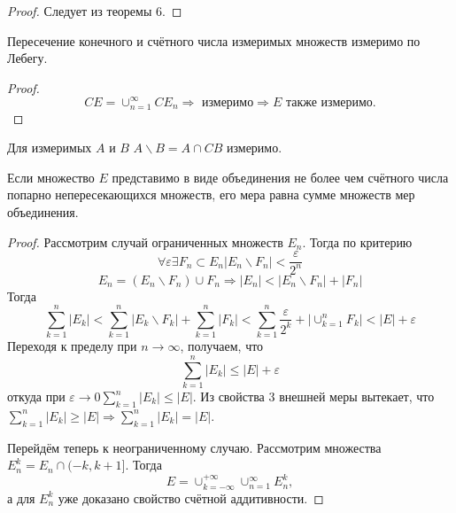 \documentclass[11pt]{article}
\newcounter{th}\setcounter{th}{0}
\def\th{\par\smallskip\refstepcounter{th}\textbf{\arabic{th}}}
\newtheorem*{Theorem}{Теорема \th}
\begin{document}
\begin{proof}
Следует из теоремы 6.
\end{proof}
\begin{Theorem}
Пересечение конечного и счётного числа измеримых множеств измеримо по Лебегу.
\end{Theorem}
\begin{proof}
\begin{equation*}
CE = \cup_{n = 1}^{\infty}CE_n \Rightarrow \text{ измеримо} \Rightarrow E\text{ также измеримо.}
\end{equation*}
\end{proof}
\begin{Theorem}
Для измеримых $A$ и $B$ $A \backslash B = A \cap CB$ измеримо.
\end{Theorem}
\begin{Theorem}
Если множество $E$ представимо в виде объединения не более чем счётного числа попарно
непересекающихся множеств, его мера равна сумме множеств мер объединения.
\end{Theorem}
\begin{proof}
Рассмотрим случай ограниченных множеств $E_n$. Тогда по критерию
\begin{equation*}
\forall \varepsilon \exists F_n \subset E_n |E_n \backslash F_n| < \frac{\varepsilon}{2^n}
\end{equation*}
\begin{equation*}
E_n = (E_n \backslash F_n) \cup F_n \Rightarrow |E_n| < |E_n \backslash F_n| + |F_n|
\end{equation*}
Тогда
\begin{equation*}
\sum_{k = 1}^n|E_k| < \sum_{k = 1}^n|E_k \backslash F_k| + \sum_{k = 1}^n|F_k| <
\sum_{k = 1}^n\frac{\varepsilon}{2^k} + |\cup_{k = 1}^nF_k| < |E| + \varepsilon
\end{equation*}
Переходя к пределу при $n \to \infty$, получаем, что
\begin{equation*}
\sum_{k = 1}^n|E_k| \leq |E| + \varepsilon
\end{equation*}
откуда при $\varepsilon \to 0 \sum_{k = 1}^n|E_k| \leq |E|$. Из свойства 3 внешней меры вытекает,
что $\sum_{k = 1}^n|E_k| \geq |E| \Rightarrow \sum_{k = 1}^n |E_k| = |E|$.

Перейдём теперь к неограниченному случаю. Рассмотрим множества $E_n^k = E_n \cap (-k, k + 1]$.
Тогда
\begin{equation}
E = \cup_{k = -\infty}^{+\infty}\cup_{n = 1}^{\infty}E^k_n,
\end{equation}
а для $E^k_n$ уже доказано свойство счётной аддитивности.
\end{proof}
\end{document}
